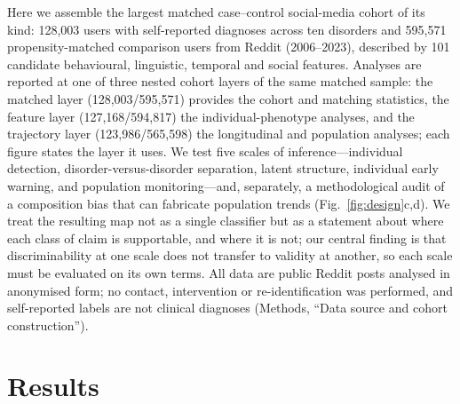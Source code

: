 \documentclass[11pt]{article}
\begin{document}
Here we assemble the largest matched case--control social-media cohort of its kind:
128{,}003 users with self-reported diagnoses across ten disorders and 595{,}571
propensity-matched comparison users from Reddit (2006--2023), described by 101 candidate
behavioural, linguistic, temporal and social features. Analyses are reported at one of three
nested cohort layers of the same matched sample: the matched layer (128{,}003/595{,}571)
provides the cohort and matching statistics, the feature layer (127{,}168/594{,}817) the
individual-phenotype analyses, and the trajectory layer (123{,}986/565{,}598) the longitudinal
and population analyses; each figure states the layer it uses. We test five scales of
inference---individual detection, disorder-versus-disorder separation, latent structure,
individual early warning, and population monitoring---and, separately, a methodological audit
of a composition bias that can fabricate population trends (Fig.~\ref{fig:design}c,d). We treat the resulting map not as a single classifier but as a statement
about where each class of claim is supportable, and where it is not; our central finding is that discriminability at one scale does not transfer to validity at another, so each scale must be evaluated on its own terms. All data are public Reddit
posts analysed in anonymised form; no contact, intervention or re-identification was performed,
and self-reported labels are not clinical diagnoses (Methods, ``Data source and cohort construction'').

\section*{Results}
\end{document}
